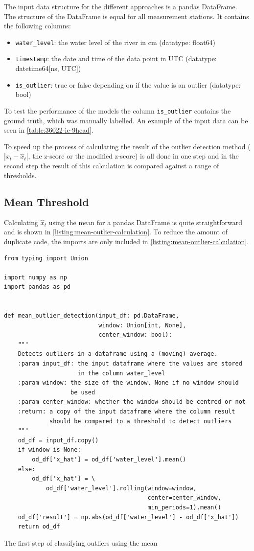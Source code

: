 The input data structure for the different approaches is a pandas DataFrame.\cite{PandasDocumentationPandas} The structure of the DataFrame is equal for all measurement stations. It contains the following columns:
\begin{itemize}
    \item \verb|water_level|: the water level of the river in cm (datatype: float64)
    \item \verb|timestamp|: the date and time of the data point in UTC (datatype: datetime64[ns, UTC])
    \item \verb|is_outlier|: true or false depending on if the value is an outlier (datatype: bool)
\end{itemize}
To test the performance of the models the column \verb|is_outlier| contains the ground truth, which was manually labelled. An example of the input data can be seen in \autoref{table:36022-ie-9head}.

\newline
To speed up the process of calculating the result of the outlier detection method ($|x_t - \hat{x}_t|$, the z-score or the modified z-score) is all done in one step and in the second step the result of this calculation is compared against a range of thresholds.
\subsection{Mean Threshold}
Calculating $\hat{x}_t$ using the mean for a pandas DataFrame \cite{PandasDocumentationPandas} is quite straightforward and is shown in \autoref{listing:mean-outlier-calculation}. To reduce the amount of duplicate code, the imports are only included in \autoref{listing:mean-outlier-calculation}.
\begin{listing}[htp]
\small
\begin{verbatim}
from typing import Union

import numpy as np
import pandas as pd


def mean_outlier_detection(input_df: pd.DataFrame,
                           window: Union[int, None],
                           center_window: bool):
    """
    Detects outliers in a dataframe using a (moving) average.
    :param input_df: the input dataframe where the values are stored
                     in the column water_level
    :param window: the size of the window, None if no window should
                   be used
    :param center_window: whether the window should be centred or not
    :return: a copy of the input dataframe where the column result
             should be compared to a threshold to detect outliers
    """
    od_df = input_df.copy()
    if window is None:
        od_df['x_hat'] = od_df['water_level'].mean()
    else:
        od_df['x_hat'] = \
            od_df['water_level'].rolling(window=window,
                                         center=center_window,
                                         min_periods=1).mean()
    od_df['result'] = np.abs(od_df['water_level'] - od_df['x_hat'])
    return od_df
\end{verbatim}
\caption{The first step of classifying outliers using the mean}
\label{listing:mean-outlier-calculation}
\end{listing}
\clearpage
